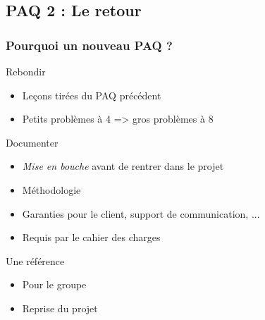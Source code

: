 \subsection{PAQ 2 : Le retour}

\begin{frame}
\tableofcontents[subsectionstyle=show/shaded/hide, subsubsectionstyle=hide, sectionstyle=show/hide]
\end{frame}

\begin{frame}
\frametitle{Pourquoi un nouveau PAQ ?}

\begin{block}{Rebondir} %
\begin{itemize}
	\item Leçons tirées du PAQ précédent %
	\item Petits problèmes à 4 => gros problèmes à 8 %
\end{itemize}
\end{block} %

\begin{block}{Documenter}
\begin{itemize}
    \item \emph{Mise en bouche} avant de rentrer dans le projet %
    \item Méthodologie %
    \item Garanties pour le client, support de communication, ...
    \item Requis par le cahier des charges
\end{itemize}
\end{block}

\begin{block}{Une référence}
\begin{itemize}
    \item Pour le groupe %
    \item Reprise du projet %
\end{itemize}
\end{block}

\end{frame} %

